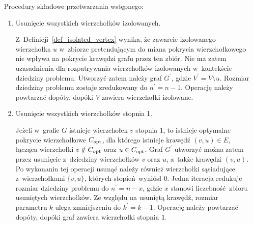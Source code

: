 Procedury składowe przetwarzania wstępnego:
\begin{enumerate}
  \item Usunięcie wszystkich wierzchołków izolowanych.

    Z~Definicji~\ref{def_isolated_vertex} wynika, że zawarcie izolowanego wierzchołka $u$ w~zbiorze pretendującym do miana pokrycia wierzchołkowego nie wpływa na pokrycie krawędzi grafu przez ten zbiór.
    Nie ma zatem uzasadnienia dla rozpatrywania wierzchołków izolowanych w~kontekście dziedziny problemu.
    Utworzyć zatem należy graf $G^\prime$, gdzie $V^\prime = V \setminus u$.
    Rozmiar dziedziny problemu zostaje zredukowany do $n^\prime=n-1$.
    Operację należy powtarzać dopóty, dopóki $V$ zawiera wierzchołki izolowane.

  \item Usunięcie wszystkich wierzchołków stopnia 1.

    Jeżeli w~grafie $G$ istnieje wierzchołek $v$ stopnia 1, to istnieje optymalne pokrycie wierzchołkowe $C_{\textnormal{opt}}$, dla którego istnieje krawędź $(v,u) \in E$, łącząca wierzchołki $v \notin C_{\textnormal{opt}}$ oraz $u \in C_{\textnormal{opt}}$.
    Graf $G^\prime$ utworzyć można zatem przez usunięcie z~dziedziny wierzchołków $v$ oraz
    $u$, a~także krawędzi $(v,u)$.
    Po wykonaniu tej operacji usunąć należy również wierzchołki sąsiadujące z~wierzchołkami
    $\{v,u\}$, których stopień~wyniósł 0.
    Jedna iteracja redukuje rozmiar dziedziny problemu do $n^\prime=n-x$, gdzie
    $x$ stanowi liczebność~zbioru usuniętych wierzchołków.
    Ze względu na usuniętą krawędź, rozmiar parametru $k$ ulega zmniejszeniu do
    $k^\prime=k-1$.
    Operację należy powtarzać dopóty, dopóki graf zawiera wierzchołki stopnia 1.


\end{enumerate}
